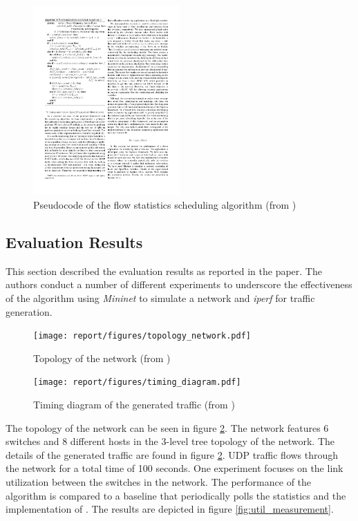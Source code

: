 \documentclass[DIV=12]{scrartcl}
\begin{document}
\begin{figure}[]
  \centering
  \includegraphics[width=0.5\textwidth]{figures/algorithm_adaptiveAlgorithm.pdf}
  \caption{Pseudocode of the flow statistics scheduling algorithm (from \cite{g3.chowdhury2014payless}) }
  \label{fig:algorithm}
\end{figure}

\subsection{Evaluation Results}
This section described the evaluation results as reported in the paper. The authors conduct a number of different experiments to underscore the effectiveness of the algorithm using \textit{Mininet} to simulate a network and \textit{iperf} for traffic generation. 

\begin{figure}[]
  \centering
  \texttt{[image: report/figures/topology\_network.pdf]}
  \caption{Topology of the network (from \cite{g3.chowdhury2014payless}) }
  \label{fig:topology_network}
\end{figure}

\begin{figure}[t]
  \centering
  \texttt{[image: report/figures/timing\_diagram.pdf]}
  \caption{Timing diagram of the generated traffic (from \cite{g3.chowdhury2014payless}) }
  \label{fig:timing_diagram}
\end{figure}

The topology of the network can be seen in figure \ref{fig:topology_network}. The network features 6 switches and 8 different hosts in the 3-level tree topology of the network. The details of the generated traffic are found in figure \ref{fig:topology_network}. UDP traffic flows through the network for a total time of 100 seconds. One experiment focuses on the link utilization between the switches in the network. The performance of the algorithm is compared to a baseline that periodically polls the statistics and the implementation of \cite{g3.yu2013flowsense}. The results are depicted in figure \ref{fig:util_measurement}. 
\end{document}

